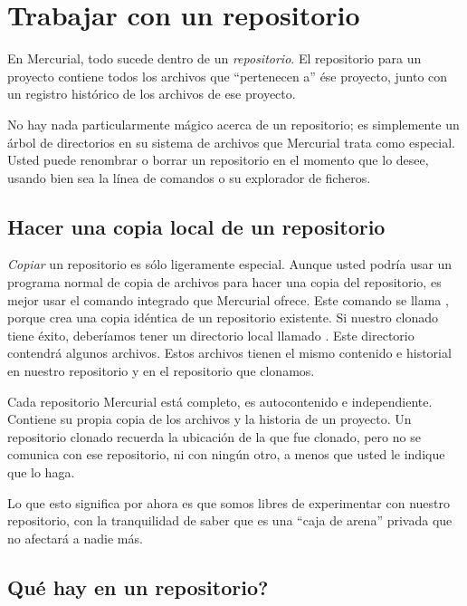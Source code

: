 \section{Trabajar con un repositorio}

En Mercurial, todo sucede dentro de un \emph{repositorio}. El
repositorio para un proyecto contiene todos los archivos que
``pertenecen a'' ése proyecto, junto con un registro histórico de los
archivos de ese proyecto.

No hay nada particularmente mágico acerca de un repositorio; es
simplemente un árbol de directorios en su sistema de archivos que
Mercurial trata como especial. Usted puede renombrar o borrar un
repositorio en el momento que lo desee, usando bien sea la línea de
comandos o su explorador de ficheros.

\subsection{Hacer una copia local de un repositorio}

\emph{Copiar} un repositorio es sólo ligeramente especial. Aunque
usted podría usar un programa normal de copia de archivos para hacer
una copia del repositorio, es mejor usar el comando integrado que
Mercurial ofrece. Este comando se llama , porque crea una copia idéntica de un
repositorio existente.
Si nuestro clonado tiene éxito, deberíamos tener un directorio local
llamado . Este directorio contendrá algunos archivos.
Estos archivos tienen el mismo contenido e historial en nuestro
repositorio y en el repositorio que clonamos.

Cada repositorio Mercurial está completo, es autocontenido e
independiente. Contiene su propia copia de los archivos y la historia
de un proyecto. Un repositorio clonado recuerda la ubicación de la que
fue clonado, pero no se comunica con ese repositorio, ni con ningún
otro, a menos que usted le indique que lo haga.

Lo que esto significa por ahora es que somos libres de experimentar
con nuestro repositorio, con la tranquilidad de saber que es una
``caja de arena'' privada que no afectará a nadie más.

\subsection{Qué hay en un repositorio?}

